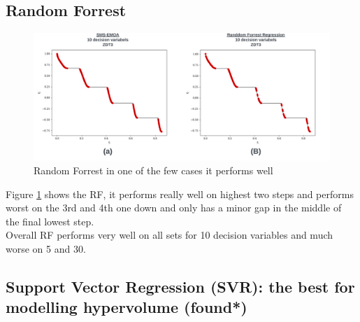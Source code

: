 \documentclass[sigconf,review,nonacm]{acmart}
\begin{document}
\subsection{Random Forrest}

\begin{figure}[H]
    \centering
    \includegraphics[width=1\linewidth]{Images/SMS_vs_RF.png}
    \caption{Random Forrest in one of the few cases it performs well}
    \label{fig:rf}
\end{figure}

Figure \ref{fig:rf} shows the RF, it performs really well on highest two steps and performs worst on the 3rd and 4th one down and only has a minor gap in the middle of the final lowest step. \\ 

\noindent Overall RF performs very well on all sets for 10 decision variables and much worse on 5 and 30. 




























\subsection{Support Vector Regression (SVR): the best for modelling hypervolume (found*)}
\end{document}
